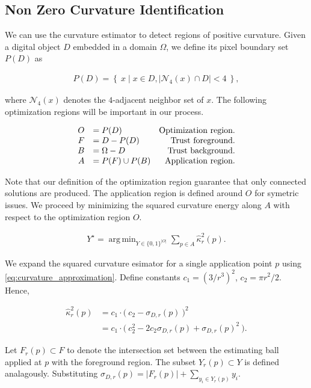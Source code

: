 \documentclass[runningheads]{llncs}
\DeclareMathOperator*{\argmin}{arg\,min}
\begin{document}
\subsection{Non Zero Curvature Identification}

We can use the curvature estimator to detect regions of positive curvature. Given a digital object $D$ embedded in a domain $\Omega$, we define its pixel boundary set $P(D)$ as

\begin{align*}
	P(D) = \left\{ \: x \; | \; x \in D, |\mathcal{N}_4(x) \cap D|<4 \: \right\},
\end{align*}

where $\mathcal{N}_4(x)$ denotes the $4$-adjacent neighbor set of $x$. The following optimization regions will be important in our process.

\[\arraycolsep=5pt
\begin{array}{rlr}
	O &= P(D) & \text{Optimization region.} \\
	F &= D - P(D) & \text{Trust foreground.} \\
	B &= \Omega - D & \text{Trust background.} \\
	A &= P(F) \cup P(B) & \text{Application region}.
\end{array}
\]

Note that our definition of the optimization region guarantee that only connected solutions are produced. The application region is defined around $O$ for symetric issues. We proceed by minimizing the squared curvature energy along $A$ with respect to the optimization region $O$. 

\begin{align}			
	Y^{\star} = \argmin_{Y \in \{0,1\}^{|O|}} \sum_{p \in A}{\hat{\kappa}_{r}^2(p)}.
	\label{eq:curvature_highlighting_opt_problem}
\end{align}

We expand the squared curvature esimator for a single application point $p$ using \eqref{eq:curvature_approximation}. Define constants $c_1 = (3/r^3)^2$, $c_2=\pi r^2/2$. Hence,

\begin{align*}
\hat{\kappa}_{r}^2(p) &= c_1 \cdot \big(\: c_2 - \sigma_{D,r}(p) \: \big)^2 \\
&= c_1 \cdot \big(\: c_2^2 - 2c_2\sigma_{D,r}(p) + \sigma_{D,r}(p)^2 \: \big).
\end{align*}

Let $F_r(p) \subset F$ to denote the intersection set between the estimating ball applied at $p$ with the foreground region. The subset $Y_r(p) \subset Y$ is defined  analagously. Substituting $\sigma_{D,r}(p) = |F_r(p)| + \sum_{y_i \in Y_r(p)}{y_i}$.
\end{document}
